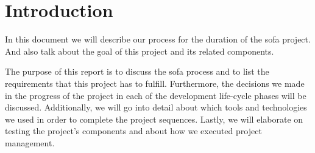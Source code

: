 \chapter{Introduction}\label{ch:introduction}
In this document we will describe our process for the duration of the \ac{sofa} project.
And also talk about the goal of this project and its related components.

The purpose of this report is to discuss the \ac{sofa} process and to list the requirements that this project has to
fulfill.
Furthermore, the decisions we made in the progress of the project in each of the development life-cycle phases will be
discussed.
Additionally, we will go into detail about which tools and technologies we used in order to complete the project
sequences.
Lastly, we will elaborate on testing the project's components and about how we executed project management.

